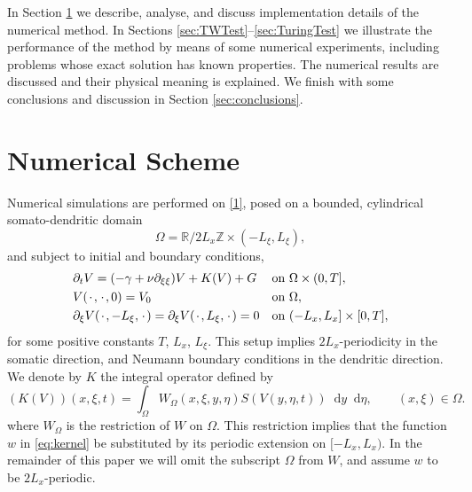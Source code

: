 \documentclass[a4paper,final]{siamart190516}
\newcommand{\Rb}{\mathbb{R}}
\newcommand{\Zb}{\mathbb{Z}}
\newcommand{\diff}{\mathop{}\!\mathrm{d}}
\begin{document}
In Section \ref{Sec:numerical} we describe, analyse, and discuss implementation
details of the numerical method. In Sections \ref{sec:TWTest}--\ref{sec:TuringTest}
we illustrate the performance of the method by means of some numerical experiments,
including problems whose exact solution has known properties. The numerical results
are discussed and their physical meaning is explained. We finish with some
conclusions and discussion in Section \ref{sec:conclusions}.

\section{Numerical Scheme}
\label{Sec:numerical}
Numerical simulations are performed on \eqref{1}, posed on a
bounded, cylindrical somato-dendritic  domain 
\[
  \Omega = \Rb/2L_x\Zb \times (-L_\xi,L_\xi), %
\]
and subject to initial and boundary conditions,
\begin{equation}\label{eq:systemNum}
  \begin{aligned}
    & \partial_t V  = (-\gamma + \nu \partial_{\xi \xi}) V + K(V) + G
    & & \textrm{on $ \Omega \times (0,T]$}, \\
  &  V(\blank,\blank,0)  = V_0
    & & \textrm{on $ \Omega$}, \\
  &  \partial_\xi V(\blank,-L_\xi,\blank) = \partial_\xi V(\blank,L_\xi,\blank) = 0
    & & \textrm{on $ (-L_x,L_x] \times [0,T]$}, \\
  \end{aligned}
\end{equation}
for some positive constants $T$, $L_x$, $L_\xi$. This setup implies
$2L_x$-periodicity in the somatic
direction, and Neumann boundary conditions in the dendritic direction.
We denote by $K$ the integral operator defined by
\[
  (K(V))(x,\xi,t) = \int_{\Omega} W_{\Omega}(x,\xi,y,\eta)
    S(V(y,\eta,t)) \diff y \diff \eta,
  \qquad (x,\xi) \in \Omega.
\]
where $W_{\Omega}$ is the restriction of $W$ on $\Omega$. This restriction implies
that the function $w$ in \eqref{eq:kernel} be substituted by
its periodic extension on $[-L_x,L_x)$. In the remainder of this paper we will omit the
subscript $\Omega$ from $W$, and assume $w$ to be $2L_x$-periodic.
\end{document}
